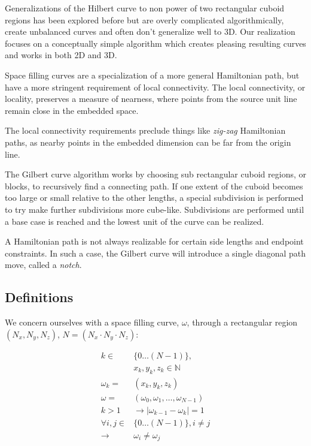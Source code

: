 Generalizations of the Hilbert curve to non power of two rectangular cuboid regions
has been explored before but are overly complicated algorithmically, create unbalanced
curves and often don't generalize well to 3D.
Our realization focuses on a conceptually simple algorithm which creates pleasing
resulting curves and works in both 2D and 3D.

Space filling curves are a specialization of a more general Hamiltonian path,
but have a more stringent requirement of local connectivity.
The local connectivity, or locality, preserves a measure of nearness, where
points from the source unit line remain close in the embedded space.

The local connectivity requirements
preclude things like \textit{zig-zag} Hamiltonian
paths, as nearby points in the embedded dimension can be far from the origin line.



The Gilbert curve algorithm works by choosing sub rectangular cuboid regions, or blocks,
to recursively find a connecting path.
If one extent of the cuboid becomes too large or small relative to the other lengths,
a special subdivision is performed to try make further subdivisions more cube-like.
Subdivisions are performed until a base case is reached and the lowest unit of the curve
can be realized.

A Hamiltonian path is not always realizable for certain side lengths and endpoint constraints.
In such a case, the Gilbert curve will introduce a single diagonal path move, called a \textit{notch}.


\subsection{Definitions}

We concern ourselves with a space filling curve, $\omega$, through a rectangular region $( N _ x, N _ y, N _ z)$,  $N = (N _ x \cdot N _ y \cdot N _ z)$:


$$
\begin{array}{rl}
  k \in & \{ 0 \dots (N-1) \}, \\
  & x _ k, y _ k, z _ k \in \mathbb{N} \\
  \omega _ k = & ( x _ k, y _ k, z _ k ) \\
  \omega = & ( \omega _ 0, \omega _ 1, \dots, \omega _ {N-1} ) \\
  k>1  & \to | \omega _ {k - 1} - \omega _ {k} | = 1 \\
  \forall i,j \in & \{ 0 \dots (N-1) \}, i \ne j  \\
  \to & \omega _ i \ne \omega _ j
\end{array}
$$


